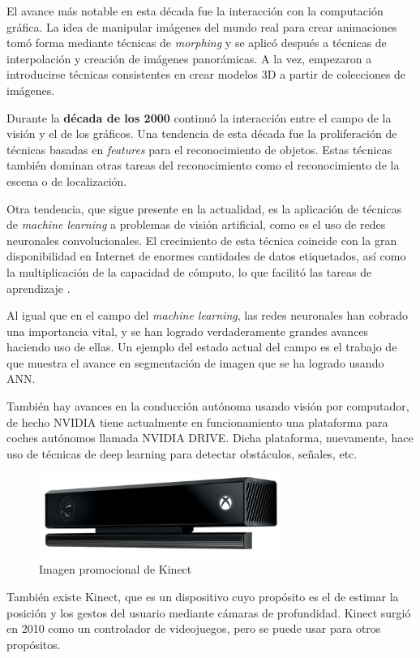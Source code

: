 El avance más notable en esta década fue la interacción con la computación gráfica. La idea de manipular imágenes del mundo real para crear animaciones tomó forma mediante técnicas de \textit{morphing} y se aplicó después a técnicas de interpolación y creación de imágenes panorámicas. A la vez, empezaron a introducirse técnicas consistentes en crear modelos 3D a partir de colecciones de imágenes.

Durante la \textbf{década de los 2000} continuó la interacción entre el campo de la visión y el de los gráficos. Una tendencia de esta década fue la proliferación de técnicas basadas en \textit{features} para el reconocimiento de objetos. Estas técnicas también dominan otras tareas del reconocimiento como el reconocimiento de la escena o de localización.

Otra tendencia, que sigue presente en la actualidad, es la aplicación de técnicas de \textit{machine learning} a problemas de visión artificial, como es el uso de redes neuronales convolucionales. El crecimiento de esta técnica coincide con la gran disponibilidad en Internet de enormes cantidades de datos etiquetados, así como la multiplicación de la capacidad de cómputo, lo que facilitó las tareas de aprendizaje \citep{book:szeliski}.

Al igual que en el campo del \textit{machine learning}, las redes neuronales han cobrado una importancia vital, y se han logrado verdaderamente grandes avances haciendo uso de ellas. Un ejemplo del estado actual del campo es el trabajo de \citet{art:2017arXiv170306870H} que muestra el avance en segmentación de imagen que se ha logrado usando ANN.

También hay avances en la conducción autónoma usando visión por computador, de hecho NVIDIA tiene actualmente en funcionamiento una plataforma para coches autónomos llamada NVIDIA DRIVE. Dicha plataforma, nuevamente, hace uso de técnicas de deep learning para detectar obstáculos, señales, etc.

\begin{figure}
    \centering
    \label{fig:kinect}
    \includegraphics[width=0.7\textwidth]{images/kinect}
    \caption{Imagen promocional de Kinect}
\end{figure}

También existe Kinect, que es un dispositivo cuyo propósito es el de estimar la posición y los gestos del usuario mediante cámaras de profundidad. Kinect surgió en 2010 como un controlador de videojuegos, pero se puede usar para otros propósitos.